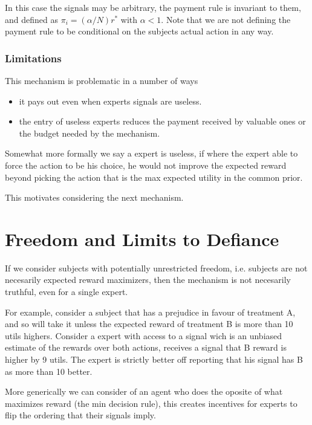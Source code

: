 In this case the signals may be arbitrary, the payment rule is invariant to them, and defined as $\pi_i  = (\alpha / N ) r^{*} $ with $\alpha < 1$. Note that we are not defining the payment rule to be conditional on the subjects actual action in any way. %


\subsubsection{Limitations}
This mechanism is problematic in a number of ways

\begin{itemize}
\item it pays out even when experts signals are useless.
\item the entry of useless experts reduces the payment received by valuable ones or the budget needed by the mechanism.
\end{itemize}

Somewhat more formally we say a expert is useless, if where the expert able to force the action to be his choice, he would not improve the expected reward beyond picking the action that is the max expected utility in the common prior.

This motivates considering the next mechanism.


\section{Freedom and Limits to Defiance}

If we consider subjects with potentially unrestricted freedom, i.e. subjects are not necesarily expected reward maximizers, then the mechanism is not necesarily truthful, even for a single expert. 

\begin{eg}
	For example, consider a subject that has a prejudice in favour of treatment A, and so will take it unless the expected reward of treatment B is more than 10 utils highers. Consider a expert with access to a signal wich is an unbiased estimate of the rewards over both actions, receives a signal  that B reward is higher by 9 utils. The expert is strictly better off reporting that his signal has B as more than 10 better.
\end{eg}

\begin{eg}
	More generically we can consider of an agent who does the oposite of what maximizes reward (the min decision rule), this creates incentives for experts to flip the ordering that their signals imply. 
\end{eg}


